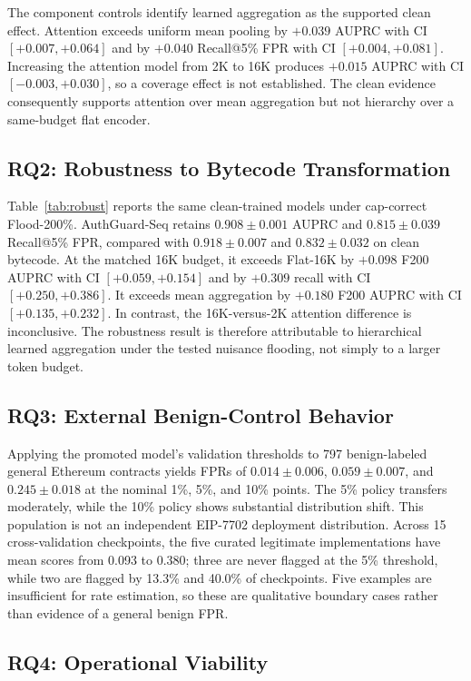 \documentclass[conference]{IEEEtran}
\begin{document}
The component controls identify learned aggregation as the supported clean effect. Attention exceeds uniform mean pooling by $+0.039$ AUPRC with CI $[+0.007,+0.064]$ and by $+0.040$ Recall@5\% FPR with CI $[+0.004,+0.081]$. Increasing the attention model from 2K to 16K produces $+0.015$ AUPRC with CI $[-0.003,+0.030]$, so a coverage effect is not established. The clean evidence consequently supports attention over mean aggregation but not hierarchy over a same-budget flat encoder.

\subsection{RQ2: Robustness to Bytecode Transformation}

Table~\ref{tab:robust} reports the same clean-trained models under cap-correct Flood-200\%. AuthGuard-Seq retains $0.908\pm0.001$ AUPRC and $0.815\pm0.039$ Recall@5\% FPR, compared with $0.918\pm0.007$ and $0.832\pm0.032$ on clean bytecode. At the matched 16K budget, it exceeds Flat-16K by $+0.098$ F200 AUPRC with CI $[+0.059,+0.154]$ and by $+0.309$ recall with CI $[+0.250,+0.386]$. It exceeds mean aggregation by $+0.180$ F200 AUPRC with CI $[+0.135,+0.232]$. In contrast, the 16K-versus-2K attention difference is inconclusive. The robustness result is therefore attributable to hierarchical learned aggregation under the tested nuisance flooding, not simply to a larger token budget.

\subsection{RQ3: External Benign-Control Behavior}

Applying the promoted model's validation thresholds to 797 benign-labeled general Ethereum contracts yields FPRs of $0.014\pm0.006$, $0.059\pm0.007$, and $0.245\pm0.018$ at the nominal 1\%, 5\%, and 10\% points. The 5\% policy transfers moderately, while the 10\% policy shows substantial distribution shift. This population is not an independent EIP-7702 deployment distribution. Across 15 cross-validation checkpoints, the five curated legitimate implementations have mean scores from 0.093 to 0.380; three are never flagged at the 5\% threshold, while two are flagged by 13.3\% and 40.0\% of checkpoints. Five examples are insufficient for rate estimation, so these are qualitative boundary cases rather than evidence of a general benign FPR.

\subsection{RQ4: Operational Viability}
\end{document}
